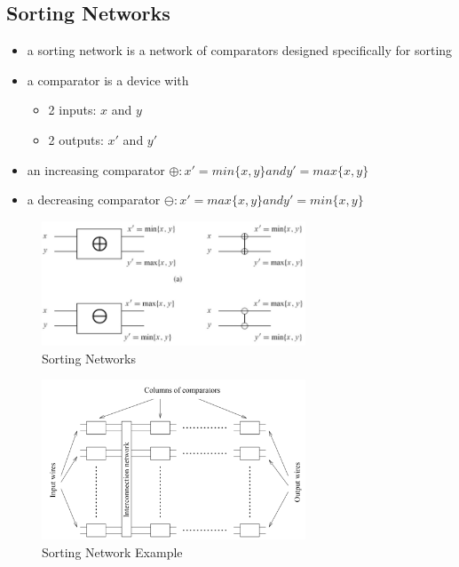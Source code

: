 \clearpage
\hypertarget{sorting-networks}{%
\subsection{Sorting Networks}\label{sorting-networks}}

\begin{itemize}
\tightlist
\item
  a sorting network is a network of comparators designed specifically
  for sorting
\item
  a comparator is a device with

  \begin{itemize}
  \tightlist
  \item
    2 inputs: $x$ and $y$
  \item
    2 outputs: $x'$ and $y'$
  \end{itemize}
\item
  an increasing comparator $\oplus : x' = min\{x,y\} and y' = max\{x,y\}$
\item
  a decreasing comparator $\ominus : x' = max\{x,y\} and y' = min\{x,y\}$
\end{itemize}

\begin{figure}[H]
\centering
\includegraphics[width=0.7\textwidth]{figures/sortingNetwork.png}
\caption{Sorting Networks}
\end{figure}

\begin{figure}[H]
\centering
\includegraphics[width=0.7\textwidth]{figures/sortingNetwork2.png}
\caption{Sorting Network Example}
\end{figure}


